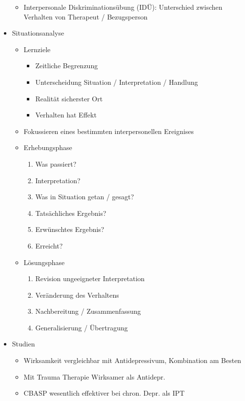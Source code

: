 \documentclass[11pt, paper=a4, twocolumn]{scrartcl}
\begin{document}
\begin{itemize}
\begin{itemize}
					\item Interpersonale Diskriminationsübung (IDÜ): Unterschied zwischen Verhalten von Therapeut / Bezugsperson 
				\end{itemize}
			\item Situationsanalyse
				\begin{itemize}
					\item Lernziele
						\begin{itemize}
							\item Zeitliche Begrenzung
							\item Unterscheidung Situation / Interpretation / Handlung
							\item Realität sicherster Ort
							\item Verhalten hat Effekt
						\end{itemize}
					\item Fokussieren eines bestimmten interpersonellen Ereignises
					\item Erhebungsphase
						\begin{enumerate}
							\item Was passiert?
							\item Interpretation?
							\item Was in Situation getan / gesagt?
							\item Tatsächliches Ergebnis?
							\item Erwünschtes Ergebnis?
							\item Erreicht?
						\end{enumerate}
					\item Lösungsphase
						\begin{enumerate}
							\item Revision ungeeigneter Interpretation
							\item Veränderung des Verhaltens
							\item Nachbereitung / Zusammenfassung
							\item Generalisierung / Übertragung
						\end{enumerate}
				\end{itemize}
			\item Studien
				\begin{itemize}
					\item Wirksamkeit vergleichbar mit Antidepressivum, Kombination am Besten
					\item Mit Trauma Therapie Wirksamer als Antidepr.
					\item CBASP wesentlich effektiver bei chron. Depr. als IPT
				\end{itemize}
		\end{itemize}
\end{document}
